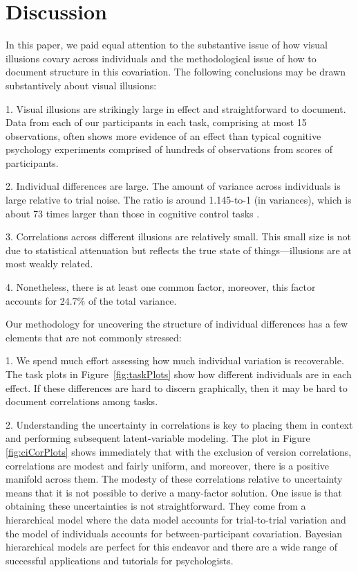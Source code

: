 \documentclass[man, 12pt]{apa7} %
\begin{document}
\section{Discussion}

In this paper, we paid equal attention to the substantive issue of how visual illusions covary across individuals and the methodological issue of how to document structure in this covariation.  The following conclusions may be drawn substantively about visual illusions:  

1. Visual illusions are strikingly large in effect and straightforward to document.  Data from each of our participants in each task, comprising at most 15 observations, often shows more evidence of an effect than typical cognitive psychology experiments comprised of hundreds of observations from scores of participants.  

2.  Individual differences are large.  The amount of variance across individuals is large relative to trial noise.  The ratio is around 1.145-to-1 (in variances), which is about 73 times larger than those in cognitive control tasks \parencite[]{Rouder.etal.2024}.  

3. Correlations across different illusions are relatively small.  This small size is not due to statistical attenuation but reflects the true state of things---illusions are at most weakly related.  

4. Nonetheless, there is at least one common factor, moreover, this factor accounts for 24.7\% of the total variance.

Our methodology for uncovering the structure of individual differences has a few elements that are not commonly stressed: 

1. We spend much effort assessing how much individual variation is recoverable.  The task plots in Figure~\ref{fig:taskPlots} show how different individuals are in each effect.  If these differences are hard to discern graphically, then it may be hard to document correlations among tasks.

2. Understanding the uncertainty in correlations is key to placing them in context and performing subsequent latent-variable modeling.  The plot in Figure \ref{fig:ciCorPlots} shows immediately that with the exclusion of version correlations, correlations are modest and fairly uniform, and moreover, there is a positive manifold across them.   The modesty of these correlations relative to uncertainty means that it is not possible to derive a many-factor solution.  One issue is that obtaining these uncertainties is not straightforward.  They come from a hierarchical model where the data model accounts for trial-to-trial variation and the model of individuals accounts for between-participant covariation.  Bayesian hierarchical models are perfect for this endeavor and there are a wide range of successful applications and tutorials for psychologists. 
\end{document}
